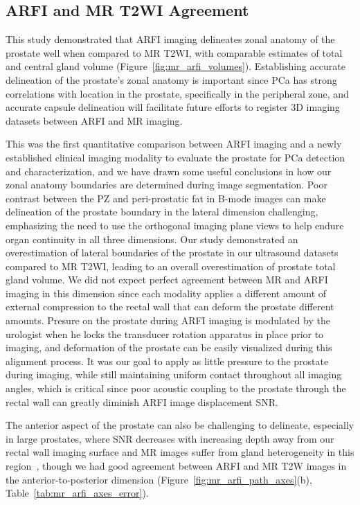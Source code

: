 \subsection{ARFI and MR T2WI Agreement}
This study demonstrated that ARFI imaging delineates zonal anatomy of the
prostate well when compared to MR T2WI, with comparable estimates of total and
central gland volume (Figure~\ref{fig:mr_arfi_volumes}).  Establishing accurate
delineation of the prostate's zonal anatomy is important since PCa has strong
correlations with location in the prostate, specifically in the peripheral
zone, and accurate capsule delineation will facilitate future efforts to
register 3D imaging datasets between ARFI and MR imaging.  

This was the first quantitative comparison between ARFI imaging and a newly
established clinical imaging modality to evaluate the prostate for PCa
detection and characterization, and we have drawn some useful conclusions in
how our zonal anatomy boundaries are determined during image segmentation.
Poor contrast between the PZ and peri-prostatic fat in B-mode images can make
delineation of the prostate boundary in the lateral dimension challenging,
emphasizing the need to use the orthogonal imaging plane views to help endure
organ continuity in all three dimensions.  Our study demonstrated an
overestimation of lateral boundaries of the prostate in our ultrasound datasets
compared to MR T2WI, leading to an overall overestimation of prostate total
gland volume.  We did not expect perfect agreement between MR and ARFI imaging
in this dimension since each modality applies a different amount of external
compression to the rectal wall that can deform the prostate different amounts.
Presure on the prostate during ARFI imaging is modulated by the urologist when
he locks the transducer rotation apparatus in place prior to imaging, and
deformation of the prostate can be easily visualized during this alignment
process.  It was our goal to apply as little pressure to the prostate during
imaging, while still maintaining uniform contact throughout all imaging angles,
which is critical since poor acoustic coupling to the prostate through the
rectal wall can greatly diminish ARFI image displacement SNR.

The anterior aspect of the prostate can also be challenging to delineate,
especially in large prostates, where SNR decreases with increasing depth away
from our rectal wall imaging surface and MR images suffer from gland
heterogeneity in this region~\cite{Gupta2013}, though we had good agreement
between ARFI and MR T2W images in the anterior-to-posterior dimension
(Figure~\ref{fig:mr_arfi_path_axes}(b), Table~\ref{tab:mr_arfi_axes_error}).

